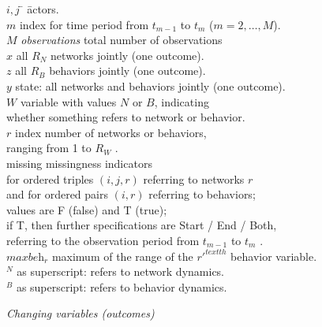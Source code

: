 \documentclass[a4paper,fleqn,12pt]{article}
\newcommand{\maxr}{\textit{maxbeh}_r}
\newcommand{\nnm}[1]{\textsf{\small\textit{#1}}}
\begin{document}
\begin{tabbing}
$i, j$ \hspace*{1em} \=  \hspace*{6em} \=  actors.\\[1ex]
$m$ \> \> index for time period from $t_{m-1}$ to $t_m$ ($m = 2, \ldots, M$).  \\[1ex]
$M$ \> \nnm{observations}   \> total number of observations\\[1ex]
$x$ \> \> all $R_N$ networks jointly (one outcome).\\[1ex]
$z$ \> \> all $R_B$ behaviors jointly (one outcome).\\[1ex]
$y$ \> \> state: all networks and behaviors jointly (one outcome).\\[1ex]
$W$ \> \> variable with values $N$ or $B$, indicating \\
    \> \> whether something refers to network or behavior.\\[1ex]
$r$ \> \> index number of networks or behaviors,\\
    \> \> ranging from 1 to $R_W$ .\\[1ex]
missing \> \> missingness indicators \\
        \> \>  for ordered triples $(i,j,r)$ referring to networks $r$ \\
        \> \> and for ordered pairs $(i,r)$ referring to behaviors;\\
        \> \> values are F (false) and T (true);\\
        \> \> if T, then further specifications are Start / End / Both,\\
        \> \> referring to the observation period from $t_{m-1}$ to $t_m$ .\\[1ex]
$\maxr$ \> \> maximum of the range of the $r'^{text{th}}$ behavior variable.\\[1ex]
$^N$ \> \> as superscript: refers to network dynamics.\\[1ex]
$^B$ \> \> as superscript: refers to behavior dynamics.\\[1ex]
\end{tabbing}
\medskip

\emph{Changing variables (outcomes)}
\end{document}
